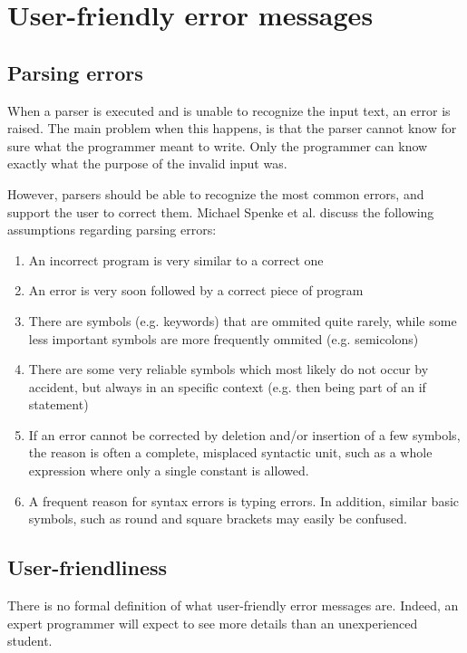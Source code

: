 
\section{User-friendly error messages}
\label{sec:errors}

\subsection{Parsing errors}
When a parser is executed and is unable to recognize the input text, an error is raised.
The main problem when this happens, is that the parser cannot know for sure what the programmer meant to write.
Only the programmer can know exactly what the purpose of the invalid input was.

However, parsers should be able to recognize the most common errors, and support the user to correct them.
Michael Spenke et al. \cite{error-recovery} discuss the following assumptions regarding parsing errors:
\begin{enumerate}
	\item An incorrect program is very similar to a correct one
	\item An error is very soon followed by a correct piece of program
	\item There are symbols (e.g. keywords) that are ommited quite rarely, while some less important symbols are more frequently ommited (e.g. semicolons)
	\item There are some very reliable symbols which most likely do not occur by accident, but always in an specific context (e.g. then being part of an if statement)
	\item  If an error cannot be corrected by deletion and/or insertion of a few symbols, the reason is often a complete, misplaced syntactic unit, such as a whole expression where only a single constant is allowed.
	\item A frequent reason for syntax errors is typing errors. In addition, similar basic symbols, such as round and square brackets may easily be confused.
\end{enumerate}

\subsection{User-friendliness}
There is no formal definition of what user-friendly error messages are.
Indeed, an expert programmer will expect to see more details than an unexperienced student.

